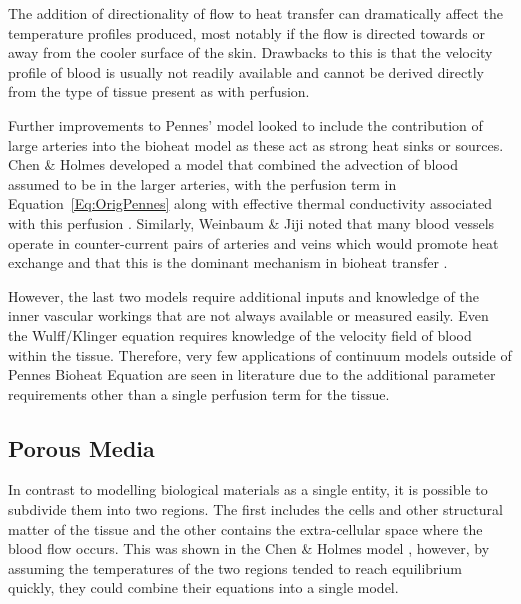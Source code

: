 \documentclass[11pt,english,a4paper,twoside,openright]{report}
\begin{document}
{{{{{{{{	The addition of directionality of flow to heat transfer can dramatically affect the temperature profiles produced, most notably if the flow is directed towards or away from the cooler surface of the skin. Drawbacks to this is that the velocity profile of blood is usually not readily available and cannot be derived directly from the type of tissue present as with perfusion.
	
	Further improvements to Pennes' model looked to include the contribution of large arteries into the bioheat model as these act as strong heat sinks or sources. Chen \& Holmes developed a model that combined the advection of blood assumed to be in the larger arteries, with the perfusion term in Equation~\ref{Eq:OrigPennes} along with effective thermal conductivity associated with this perfusion \cite{chen1980microvascular}. Similarly, Weinbaum \& Jiji noted that many blood vessels operate in counter-current pairs of arteries and veins which would promote heat exchange and that this is the dominant mechanism in bioheat transfer \cite{weinbaum1985new}. 
	
	However, the last two models require additional inputs and knowledge of the inner vascular workings that are not always available or measured easily. Even the Wulff/Klinger equation requires knowledge of the velocity field of blood within the tissue. Therefore, very few applications of continuum models outside of Pennes Bioheat Equation are seen in literature due to the additional parameter requirements other than a single perfusion term for the tissue.
	
	\subsection{Porous Media}
	
	In contrast to modelling biological materials as a single entity, it is possible to subdivide them into two regions. The first includes the cells  and other structural matter of the tissue and the other contains the extra-cellular space where the blood flow occurs. This was shown in the Chen \& Holmes model \cite{chen1980microvascular}, however, by assuming the temperatures of the two regions tended to reach equilibrium quickly, they could combine their equations into a single model.
	
}}}}}}}}
\end{document}
